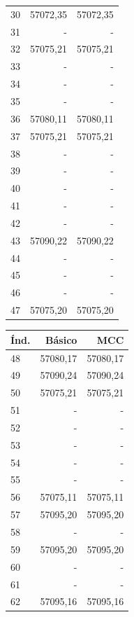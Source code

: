 \begin{appendix}
\begin{table}[h!]
\begin{tabular}{|l|r|r|}
30&57072,35 & 57072,35 \\
31&-             & -             \\
32&57075,21 & 57075,21 \\
33&-             & -             \\
34&-             & -             \\
35&-             & -             \\
36&57080,11 & 57080,11 \\
37&57075,21 & 57075,21 \\
38&-             & -             \\
39&-             & -             \\
40&-             & -             \\
41&-             & -             \\
42&-             & -             \\
43&57090,22 & 57090,22\\
44&-             & -             \\
45&-             & -             \\
46&-             & -             \\
47&57075,20 & 57075,20 \\\hline
\end{tabular}
\quad
\begin{tabular}{|l|r|r|}
\hline
\textbf{\'Ind.} & \textbf{B\'asico} & \textbf{MCC} \\
\hline
48&57080,17 & 57080,17 \\
49&57090,24 & 57090,24 \\
50&57075,21 & 57075,21 \\
51&-             & -             \\
52&-             & -             \\
53&-             & -             \\
54&-             & -             \\
55&-             & -             \\
56&57075,11  & 57075,11  \\
57&57095,20 & 57095,20 \\
58&-             & -             \\
59&57095,20 & 57095,20\\
60&-             & -             \\
61&-             & -             \\
62&57095,16 & 57095,16\\

\end{tabular}
\end{table}
\end{appendix}

